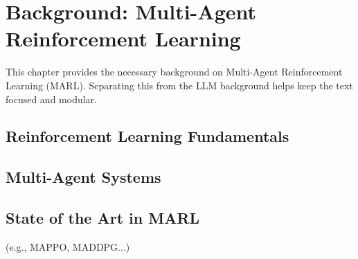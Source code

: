 \section{Background: Multi-Agent Reinforcement Learning}
\label{ch:background_marl}

This chapter provides the necessary background on Multi-Agent Reinforcement Learning (MARL). 
Separating this from the LLM background helps keep the text focused and modular.

\subsection{Reinforcement Learning Fundamentals}

\subsection{Multi-Agent Systems}

\subsection{State of the Art in MARL}
(e.g., MAPPO, MADDPG...)
